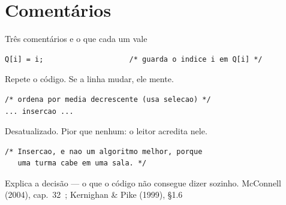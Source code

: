 \documentclass[aspectratio=169]{beamer}
\newcommand{\fonte}[1]{\vfill\hfill{\scriptsize\textcolor{UFSGray}{#1}}}
\begin{document}
\section{Comentários}

\begin{frame}[fragile]{Três comentários e o que cada um vale}
\begin{lstlisting}[style=tinyC]
Q[i] = i;                    /* guarda o indice i em Q[i] */
\end{lstlisting}
  \small\textcolor{UFSRed}{Repete o código.} Se a linha mudar, ele mente.
  \medskip
\begin{lstlisting}[style=tinyC]
/* ordena por media decrescente (usa selecao) */
... insercao ...
\end{lstlisting}
  \small\textcolor{UFSRed}{Desatualizado.} Pior que nenhum: o leitor acredita
  nele.
  \medskip
\begin{lstlisting}[style=tinyC]
/* Insercao, e nao um algoritmo melhor, porque
   uma turma cabe em uma sala. */
\end{lstlisting}
  \small\textcolor{UFSBlue}{Explica a decisão} --- o que o código não
  consegue dizer sozinho.
  \fonte{McConnell (2004), cap.~32~\cite{mcconnell2004code}; Kernighan \& Pike (1999), §1.6~\cite{kernighan1999practice}}
\end{frame}
\end{document}
